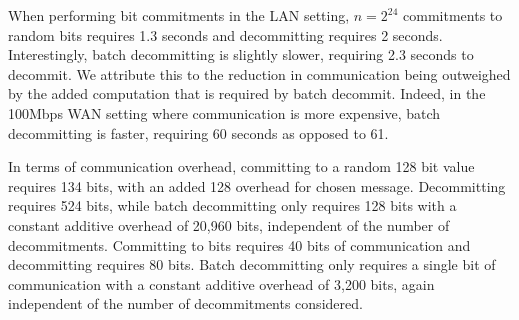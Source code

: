 When performing bit commitments in the LAN setting, $n=2^{24}$ commitments to random bits requires 1.3 seconds and decommitting requires 2 seconds. Interestingly, batch decommitting is slightly slower, requiring 2.3 seconds to decommit. We attribute this to the reduction in communication being outweighed by the added computation that is required by batch decommit. Indeed, in the 100Mbps WAN setting where communication is more expensive, batch decommitting is faster, requiring 60 seconds as opposed to 61.

In terms of communication overhead, committing to a random 128 bit value requires 134 bits, with an added 128 overhead for chosen message. Decommitting requires 524 bits, while batch decommitting only requires 128 bits with a constant additive overhead of 20,960 bits, independent of the number of decommitments. Committing to bits requires 40 bits of communication and decommitting requires 80 bits. Batch decommitting only requires a single bit of communication with a constant additive overhead of 3,200 bits, again independent of the number of decommitments considered.

